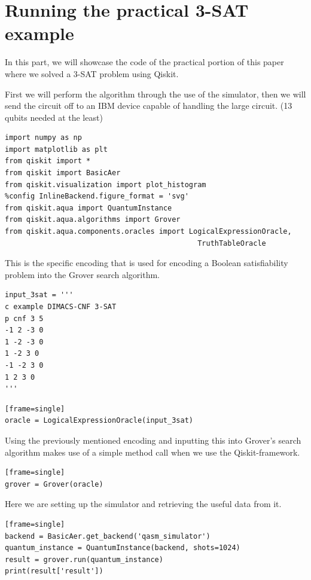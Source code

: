 \section{Running the practical 3-SAT example}

In this part, we will showcase the code of the practical portion of this paper where we solved a 3-SAT problem using Qiskit.

First we will perform the algorithm through the use of the simulator, then we will send the circuit off to an IBM device capable of handling the large circuit. (13 qubits needed at the least)

\begin{verbatim}
import numpy as np
import matplotlib as plt
from qiskit import *
from qiskit import BasicAer
from qiskit.visualization import plot_histogram
%config InlineBackend.figure_format = 'svg'
from qiskit.aqua import QuantumInstance
from qiskit.aqua.algorithms import Grover
from qiskit.aqua.components.oracles import LogicalExpressionOracle,
											 TruthTableOracle
\end{verbatim}

This is the specific encoding that is used for encoding a Boolean satisfiability problem into the Grover search algorithm.

\begin{verbatim}
input_3sat = '''
c example DIMACS-CNF 3-SAT
p cnf 3 5
-1 2 -3 0
1 -2 -3 0
1 -2 3 0
-1 -2 3 0
1 2 3 0
'''
\end{verbatim}

\begin{verbatim}[frame=single]
oracle = LogicalExpressionOracle(input_3sat)
\end{verbatim}

Using the previously mentioned encoding and inputting this into Grover's search algorithm makes use of a simple method call when we use the Qiskit-framework.

\begin{verbatim}[frame=single]
grover = Grover(oracle)
\end{verbatim}

Here we are setting up the simulator and retrieving the useful data from it.

\begin{verbatim}[frame=single]
backend = BasicAer.get_backend('qasm_simulator')
quantum_instance = QuantumInstance(backend, shots=1024)
result = grover.run(quantum_instance)
print(result['result'])
\end{verbatim}


